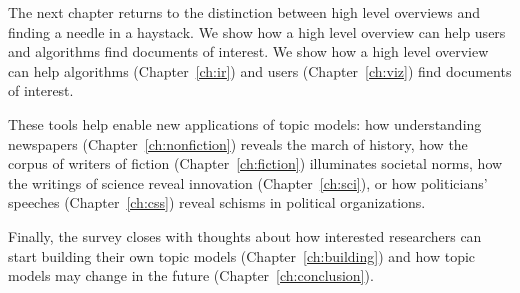 The next chapter returns to the distinction between high level
overviews and finding a needle in a haystack.  We show how a high
level overview can help users and algorithms find documents of
interest.  We show how a high level overview can help
algorithms (Chapter~\ref{ch:ir}) and users (Chapter~\ref{ch:viz}) find documents
of interest.

These tools help enable new applications of topic models: how
understanding newspapers (Chapter~\ref{ch:nonfiction}) reveals the
march of history, how the corpus of writers of fiction
(Chapter~\ref{ch:fiction}) illuminates societal norms, how the
writings of science reveal innovation (Chapter~\ref{ch:sci}), or
how politicians' speeches (Chapter~\ref{ch:css}) reveal schisms in
political organizations.

Finally, the survey closes with thoughts about how interested
researchers can start building their own topic models
(Chapter~\ref{ch:building}) and how topic models may change in the
future (Chapter~\ref{ch:conclusion}).
